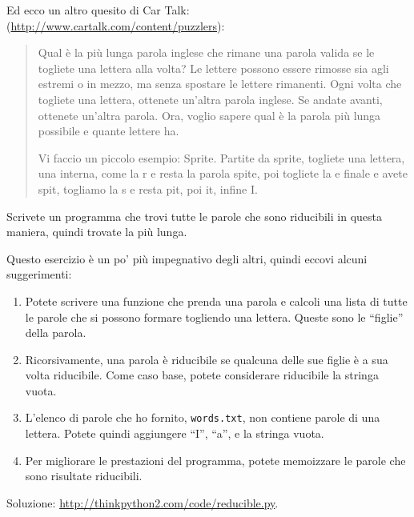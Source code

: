 \documentclass[10pt]{book}
\begin{document}
\vspace{0.2in}
\begin{exercise}

Ed ecco un altro quesito di Car Talk:
(\url{http://www.cartalk.com/content/puzzlers}):

\begin{quote}
Qual è la più lunga parola inglese che rimane una parola valida se le togliete una lettera alla volta? 
Le lettere possono essere rimosse sia agli estremi o in mezzo, ma senza spostare le lettere rimanenti. Ogni volta che togliete una lettera, ottenete un'altra parola inglese. Se andate avanti, ottenete un'altra parola. Ora, voglio sapere qual è la parola più lunga possibile e quante lettere ha.

Vi faccio un piccolo esempio: Sprite. Partite da sprite, togliete una lettera, una interna, come la r e resta la parola spite, poi togliete la e finale e avete spit, togliamo la s e resta pit, poi it, infine I.
\end{quote}

Scrivete un programma che trovi tutte le parole che sono riducibili in questa maniera, quindi trovate la più lunga.

Questo esercizio è un po' più impegnativo degli altri, quindi eccovi alcuni suggerimenti:

\begin{enumerate}

\item Potete scrivere una funzione che prenda una parola e calcoli una lista di tutte le parole che si possono formare togliendo una lettera. Queste sono le ``figlie'' della parola.

\item Ricorsivamente, una parola è riducibile se qualcuna delle sue figlie è a sua volta riducibile. Come caso base, potete considerare riducibile la stringa vuota.

\item L'elenco di parole che ho fornito, {\tt words.txt}, non contiene parole di una lettera. Potete quindi aggiungere ``I'', ``a'', e la stringa vuota.

\item Per migliorare le prestazioni del programma, potete memoizzare le parole che sono risultate riducibili.

\end{enumerate}

Soluzione: \url{http://thinkpython2.com/code/reducible.py}.

\end{exercise}
\end{document}

